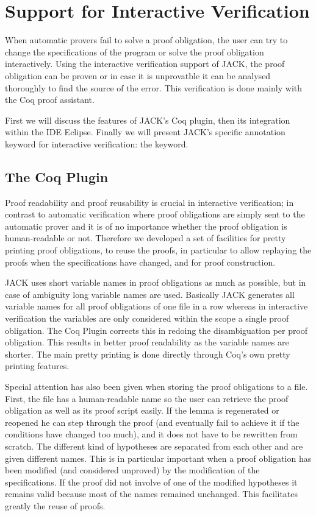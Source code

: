 

\section{Support for Interactive Verification}\label{SecInteractive}
When automatic provers fail to solve a proof obligation,
the user can try to change the specifications of the program or
 solve the proof obligation interactively.
Using the interactive verification support of JACK,
the proof obligation can be proven or in case it is unprovatble it
can be analysed thoroughly to find the source of the error.
This verification is done mainly with the Coq proof assistant. 

First we will discuss the features of JACK's Coq plugin, then its 
integration within the IDE Eclipse. Finally we will present
 JACK's specific annotation keyword for interactive verification: the 
\native keyword. 

\subsection{The Coq Plugin}
Proof readability and proof reusability is crucial in interactive 
verification; in contrast to automatic verification 
where proof obligations are simply sent to the automatic prover 
and it is of no importance whether the proof obligation is human-readable or not.
Therefore we developed a set of facilities for pretty printing proof obligations, 
to reuse the proofs, in particular to allow replaying the proofs 
when the specifications have changed, and for proof construction.

JACK uses short variable names in proof obligations as much as possible, 
but in case of ambiguity long variable names are used.
Basically JACK generates all variable names for all proof obligations of one 
file in a row whereas in interactive verification the variables are only 
considered within the scope a single proof obligation.
The Coq Plugin corrects this in redoing the disambiguation per proof 
obligation.
This results in better proof readability as the variable names are shorter.
The main pretty printing is done directly through Coq's own pretty printing 
features. 


Special attention has also been given when storing the proof obligations 
to a file. First, the file has a human-readable name so the user can retrieve 
the proof obligation as well as its proof script easily. 
If the lemma is regenerated or reopened he can step through the proof 
(and eventually fail to achieve it if the conditions have changed too much), 
and it does not have to be rewritten from scratch.
The different kind of hypotheses are separated from each other and
are given different names.
This is in particular important when a proof obligation has been modified 
(and considered unproved) by the modification of the specifications. 
If the proof did not involve of one of the modified hypotheses
it remains valid because most of the names remained
unchanged. This facilitates greatly the reuse of proofs.

